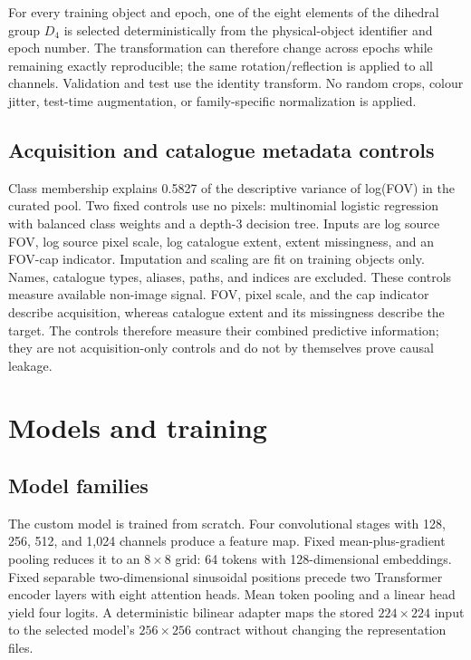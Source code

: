 \documentclass[preprint,12pt,authoryear]{elsarticle}
\begin{document}
For every training object and epoch, one of the eight elements of the dihedral group
$D_4$ is selected deterministically from the physical-object identifier and epoch
number. The transformation can therefore change across epochs while remaining
exactly reproducible; the same rotation/reflection is applied to all channels.
Validation and test use the identity transform. No random crops, colour jitter,
test-time augmentation, or family-specific normalization is applied.

\subsection{Acquisition and catalogue metadata controls}

Class membership explains 0.5827 of the descriptive variance of log(FOV) in the
curated pool. Two fixed controls use no pixels: multinomial logistic regression with
balanced class weights and a depth-3 decision tree. Inputs are log source FOV, log
source pixel scale, log catalogue extent, extent missingness, and an FOV-cap
indicator. Imputation and scaling are fit on training objects only. Names, catalogue
types, aliases, paths, and indices are excluded. These controls measure available
non-image signal. FOV, pixel scale, and the cap indicator describe acquisition,
whereas catalogue extent and its missingness describe the target. The controls
therefore measure their combined predictive information; they are not
acquisition-only controls and do not by themselves prove causal leakage.

\section{Models and training}

\subsection{Model families}

The custom model is trained from scratch. Four convolutional stages with 128, 256,
512, and 1,024 channels produce a feature map. Fixed mean-plus-gradient pooling
reduces it to an $8\times8$ grid: 64 tokens with 128-dimensional embeddings. Fixed
separable two-dimensional sinusoidal positions precede two Transformer encoder
layers with eight attention heads. Mean token pooling and a linear head yield four
logits. A deterministic bilinear adapter maps the stored $224\times224$ input to the
selected model's $256\times256$ contract without changing the representation files.
\end{document}
